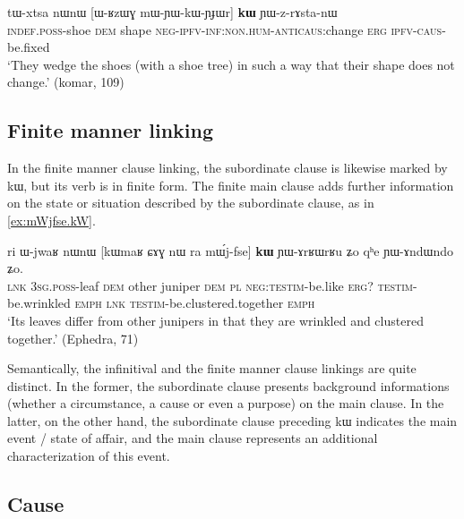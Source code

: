 \documentclass[oldfontcommands,oneside,a4paper,11pt]{article}
\newcommand{\ipa}[1]{{\phon #1}} %
\begin{document}
 

\begin{exe}
\ex \label{ex:mWYWkWYJWr}
\gll
\ipa{tɯ-xtsa}   	\ipa{nɯnɯ}   	[\ipa{ɯ-ʁzɯɣ}   	\ipa{mɯ-ɲɯ-kɯ-ɲɟɯr}]   	\ipa{\textbf{kɯ}}   	\ipa{ɲɯ-z-rɤsta-nɯ}   \\
\textsc{indef.poss}-shoe \textsc{dem} shape \textsc{neg-ipfv-inf:non.hum-anticaus}:change \textsc{erg} \textsc{ipfv-caus}-be.fixed \\
\glt `They wedge the shoes (with a shoe tree)  in such a way that their shape does not change.' (komar, 109)
\end{exe}

\subsection{Finite manner linking}
In the finite manner clause linking, the subordinate clause is likewise marked by \ipa{kɯ}, but its verb is in finite form. The  finite  main clause adds further information on the state or situation described by the subordinate clause, as in \ref{ex:mWjfse.kW}. 
 

 \begin{exe}
\ex \label{ex:mWjfse.kW}
\gll
\ipa{ri} 	\ipa{ɯ-jwaʁ} 	\ipa{nɯnɯ} 	[\ipa{kɯmaʁ} 	\ipa{ɕɤɣ} 	\ipa{nɯ} \ipa{ra} 	\ipa{mɯ́j-fse}] 	\ipa{\textbf{kɯ}} 	\ipa{ɲɯ-ɤrʁɯrʁu} 	\ipa{ʑo} 	\ipa{qʰe} 	\ipa{ɲɯ-ɤndɯndo} 	\ipa{ʑo.} \\
\textsc{lnk} \textsc{3sg.poss}-leaf \textsc{dem} other juniper \textsc{dem} \textsc{pl} \textsc{neg:testim}-be.like \textsc{erg?} \textsc{testim}-be.wrinkled \textsc{emph} \textsc{lnk}  \textsc{testim}-be.clustered.together \textsc{emph} \\
\glt `Its leaves differ from other junipers in that they are wrinkled and clustered together.' (Ephedra, 71)
 \end{exe}
 
Semantically,  the infinitival and the finite manner clause linkings are quite distinct. In the former, the subordinate clause presents background informations (whether a circumstance, a cause or even a purpose) on the main clause. In the latter, on the other hand, the subordinate clause preceding \ipa{kɯ} indicates the main event / state of affair, and the main clause represents an additional characterization of this event.


\subsection{Cause} \label{sec:cause}
\end{document}
